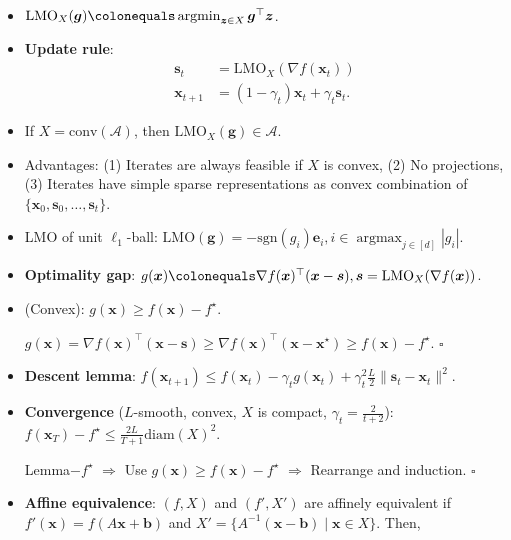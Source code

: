 \documentclass[8pt,a4paper]{extarticle}
\renewcommand{\proof}[1]{\begin{tcolorbox}#1 \hfill $\square$\end{tcolorbox}}
\DeclareMathOperator*{\argmax}{argmax}
\DeclareMathOperator*{\argmin}{argmin}
\renewcommand{\vec}[1]{\bm{#1}}
\newcommand{\mat}[1]{#1}
\newenvironment{topic}[1]
{\textbf{\sffamily \colorbox{black}{\rlap{\textbf{\textcolor{white}{#1}}}\hspace{\linewidth}\hspace{-2\fboxsep}}} \\ \vspace{0.2cm}}
{}
\begin{document}
\begin{multicols*}{2}
    \begin{topic}{Frank-Wolfe}
        \begin{itemize}
            \item $\mathrm{LMO}_X(\vec{g}) \colonequals \argmin_{\vec{z} \in X} \vec{g}^\top \vec{z}$.
            \item \textbf{Update rule}:
                  \begin{align*}
                      \vec{s}_t     & = \mathrm{LMO}_X(\nabla f(\vec{x}_t))          \\
                      \vec{x}_{t+1} & = (1-\gamma_t) \vec{x}_t + \gamma_t \vec{s}_t.
                  \end{align*}
            \item If $X = \mathrm{conv}(\mathcal{A})$, then $\mathrm{LMO}_X(\vec{g}) \in \mathcal{A}$.
            \item Advantages: (1) Iterates are always feasible if $X$ is convex, (2) No projections, (3) Iterates
                  have simple sparse representations as convex combination of $\{ \vec{x}_0, \vec{s}_0, \ldots,
                      \vec{s}_t \}$.
            \item LMO of unit $\ell_1$-ball: $\mathrm{LMO}(\vec{g}) = -\mathrm{sgn}(g_i) \vec{e}_i, i \in \argmax_{j
                          \in [d]} |g_i|$.
            \item \textbf{Optimality gap}: $g(\vec{x}) \colonequals \nabla f(\vec{x})^\top (\vec{x} - \vec{s}), \vec{s} = \mathrm{LMO}_X(\nabla f(\vec{x}))$.
            \item (Convex): $g(\vec{x}) \geq f(\vec{x}) - f^\star$.
                  \proof{$g(\vec{x}) = \nabla f(\vec{x})^\top (\vec{x} - \vec{s}) \geq \nabla f(\vec{x})^\top(\vec{x} - \vec{x}^\star) \geq f(\vec{x}) - f^\star$.}
            \item \textbf{Descent lemma}: $f(\vec{x}_{t+1}) \leq f(\vec{x}_t) - \gamma_t g(\vec{x}_t) + \gamma_t^2 \frac{L}{2} \| \vec{s}_t - \vec{x}_t \|^2$.
            \item \textbf{Convergence} ($L$-smooth, convex, $X$ is compact, $\gamma_t = \frac{2}{t+2}$): \\ $f(\vec{x}_T) - f^\star \leq \frac{2L}{T+1} \mathrm{diam}(X)^2$.
                  \proof{Lemma$-f^\star$ $\Rightarrow$ Use $g(\vec{x}) \geq f(\vec{x}) - f^\star$ $\Rightarrow$ Rearrange and induction.}
            \item \textbf{Affine equivalence}: $(f, X)$ and $(f', X')$ are affinely equivalent if $f'(\vec{x}) = f(\mat{A} \vec{x} + \vec{b})$ and $X' = \{ \mat{A}^{-1}(\vec{x} - \vec{b}) \mid \vec{x} \in X \}$. Then,

\end{itemize}
\end{topic}
\end{multicols*}
\end{document}
